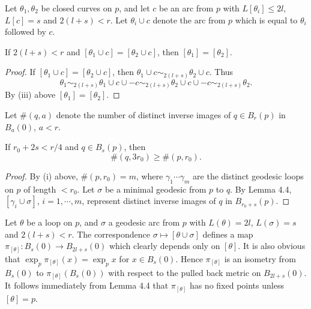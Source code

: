 Let $\theta_1,\theta_2$ be closed curves on $p$, and let $c$ be an arc from $p$
with $L[\theta_i]\le 2l$, $L[c]=s$ and $2(l+s)<r$. Let $\theta_i \cup c$ denote
the arc from $p$ which is equal to $\theta_i$ followed by $c$.

\begin{lemma}
\label{lem:radial-class-concatenation}
If $2(l+s)<r$ and $[\theta_1\cup c]=[\theta_2\cup c]$, then $[\theta_1]=[\theta_2]$.
\end{lemma}

\begin{proof}
If $[\theta_1\cup c]=[\theta_2\cup c]$, then $\theta_1\cup c \sim_{2(l+s)}
\theta_2\cup c$. Thus
\[
\theta_1 \sim_{2(l+s)} \theta_1\cup c\cup -c \sim_{2(l+s)}
\theta_2\cup c\cup -c \sim_{2(l+s)} \theta_2.
\]
By (iii) above $[\theta_1]=[\theta_2]$.
\end{proof}

Let $\#(q,a)$ denote the number of distinct inverse images of $q \in B_r(p)$ in
$B_a(0)$, $a < r$.

\begin{lemma}
\label{lem:even-covering}
If $r_0 + 2s < r/4$ and $q \in B_s(p)$, then
\[
\#(q,3r_0) \ge \#(p,r_0).
\]
\end{lemma}

\begin{proof}
By (i) above, $\#(p,r_0)=m$, where $\gamma_1 \cdots \gamma_m$ are the distinct
geodesic loops on $p$ of length $< r_0$. Let $\sigma$ be a minimal geodesic from
$p$ to $q$. By Lemma 4.4, $[\gamma_i \cup \sigma]$, $i=1,\cdots,m$, represent
distinct inverse images of $q$ in $B_{r_0+s}(p)$.
\end{proof}

Let $\theta$ be a loop on $p$, and $\sigma$ a geodesic arc from $p$ with
$L(\theta)=2l$, $L(\sigma)=s$ and $2(l+s)<r$. The correspondence
$\sigma \mapsto [\theta \cup \sigma]$ defines a map $\pi_{[\theta]}: B_s(0) \to
B_{2l+s}(0)$ which clearly depends only on $[\theta]$. It is also obvious that
$\exp_p \pi_{[\theta]}(x)=\exp_p x$ for $x \in B_s(0)$. Hence $\pi_{[\theta]}$ is
an isometry from $B_s(0)$ to $\pi_{[\theta]}(B_s(0))$ with respect to the pulled
back metric on $B_{2l+s}(0)$. It follows immediately from Lemma 4.4 that
$\pi_{[\theta]}$ has no fixed points unless $[\theta]=p$.

